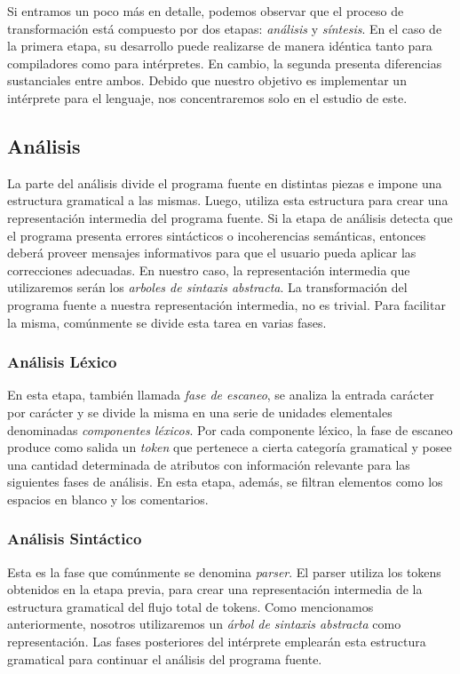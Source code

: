Si entramos un poco más en detalle, podemos observar que el proceso de transformación está compuesto por dos etapas: \textit{análisis} y \textit{síntesis}.
En el caso de la primera etapa, su desarrollo puede realizarse de manera idéntica tanto para compiladores como para intérpretes.
En cambio, la segunda presenta diferencias sustanciales entre ambos.
Debido que nuestro objetivo es implementar un intérprete para el lenguaje, nos concentraremos solo en el estudio de este.

\subsection{Análisis}

La parte del análisis divide el programa fuente en distintas piezas e impone una estructura gramatical a las mismas.
Luego, utiliza esta estructura para crear una representación intermedia del programa fuente.
Si la etapa de análisis detecta que el programa presenta errores sintácticos o incoherencias semánticas, entonces deberá proveer mensajes informativos para que el usuario pueda aplicar las correcciones adecuadas.
En nuestro caso, la representación intermedia que utilizaremos serán los \textit{arboles de sintaxis abstracta}.
La transformación del programa fuente a nuestra representación intermedia, no es trivial.
Para facilitar la misma, comúnmente se divide esta tarea en varias fases.

\subsubsection{Análisis Léxico}

En esta etapa, también llamada \textit{fase de escaneo}, se analiza la entrada carácter por carácter y se divide la misma en una serie de unidades elementales denominadas \textit{componentes léxicos}.
Por cada componente léxico, la fase de escaneo produce como salida un \textit{token} que pertenece a cierta categoría gramatical y posee una cantidad determinada de atributos con información relevante para las siguientes fases de análisis.
En esta etapa, además, se filtran elementos como los espacios en blanco y los comentarios.

\subsubsection{Análisis Sintáctico}

Esta es la fase que comúnmente se denomina \textit{parser}.
El parser utiliza los tokens obtenidos en la etapa previa, para crear una representación intermedia de la estructura gramatical del flujo total de tokens.
Como mencionamos anteriormente, nosotros utilizaremos un \textit{árbol de sintaxis abstracta} como representación.
Las fases posteriores del intérprete emplearán esta estructura gramatical para continuar el análisis del programa fuente.

